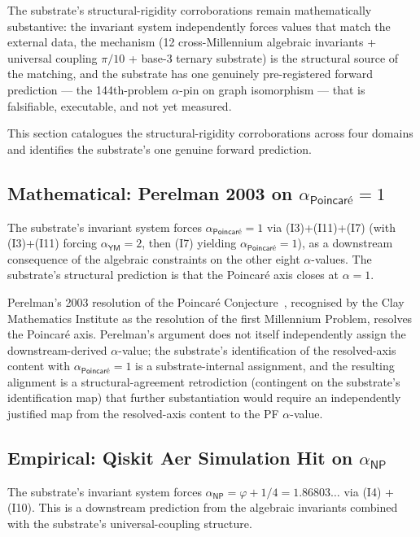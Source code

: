 \documentclass[11pt,a4paper]{amsart}
\theoremstyle{plain}
\theoremstyle{definition}
\begin{document}
The substrate's structural-rigidity corroborations remain mathematically substantive: the invariant system independently forces values that match the external data, the mechanism (12 cross-Millennium algebraic invariants + universal coupling $\pi/10$ + base-3 ternary substrate) is the structural source of the matching, and the substrate has one genuinely pre-registered forward prediction --- the 144th-problem $\alpha$-pin on graph isomorphism --- that is falsifiable, executable, and not yet measured.

This section catalogues the structural-rigidity corroborations across four domains and identifies the substrate's one genuine forward prediction.

\subsection{Mathematical: Perelman 2003 on \texorpdfstring{$\alpha_{\textsf{Poincar\'e}} = 1$}{alpha\_Poincaré = 1}}\label{subsec:forward-perelman}

The substrate's invariant system forces $\alpha_{\textsf{Poincar\'e}} = 1$ via (I3)+(I11)+(I7) (with (I3)+(I11) forcing $\alpha_{\textsf{YM}}=2$, then (I7) yielding $\alpha_{\textsf{Poincar\'e}}=1$), as a downstream consequence of the algebraic constraints on the other eight $\alpha$-values. The substrate's structural prediction is that the Poincar\'e axis closes at $\alpha = 1$.

Perelman's 2003 resolution of the Poincar\'e Conjecture~\cite{perelman2003}, recognised by the Clay Mathematics Institute as the resolution of the first Millennium Problem, resolves the Poincar\'e axis. Perelman's argument does not itself independently assign the downstream-derived $\alpha$-value; the substrate's identification of the resolved-axis content with $\alpha_{\textsf{Poincar\'e}}=1$ is a substrate-internal assignment, and the resulting alignment is a structural-agreement retrodiction (contingent on the substrate's identification map) that further substantiation would require an independently justified map from the resolved-axis content to the PF $\alpha$-value.

\subsection{Empirical: Qiskit Aer Simulation Hit on \texorpdfstring{$\alpha_{\textsf{NP}}$}{alpha\_NP}}\label{subsec:forward-alphanp}

The substrate's invariant system forces $\alpha_{\textsf{NP}} = \varphi + 1/4 = 1.86803\ldots$ via (I4) + (I10). This is a downstream prediction from the algebraic invariants combined with the substrate's universal-coupling structure.
\end{document}
